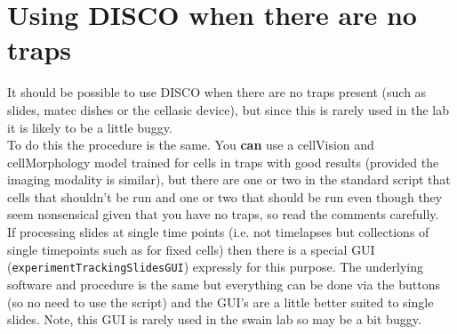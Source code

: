 \section{Using DISCO when there are no traps}
\label{sec:no_traps}

It should be possible to use DISCO when there are no traps present (such as slides, matec dishes or the cellasic device), but since this is rarely used in the lab it is likely to be a little buggy. \\
To do this the procedure is the same. You \textbf{can} use a cellVision and cellMorphology model trained for cells in traps with good results (provided the imaging modality is similar), but there are one or two in the standard script that cells that shouldn't be run and one or two that should be run even though they seem nonsensical given that you have no traps, so read the comments carefully.\\
If processing slides at single time points (i.e. not timelapses but collections of single timepoints such as for fixed cells) then there is a special GUI (\texttt{experimentTrackingSlidesGUI}) expressly for this purpose. The underlying software and procedure is the same but everything can be done via the buttons (so no need to use the script) and the GUI's are a little better suited to single slides. Note, this GUI is rarely used in the swain lab so may be a bit buggy.
